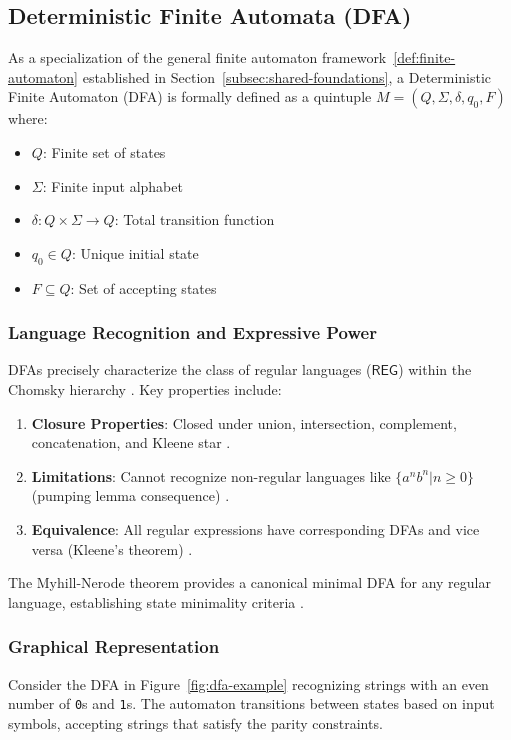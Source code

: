 \subsection{Deterministic Finite Automata (DFA)}
\label{subsec:dfa} 

As a specialization of the general finite automaton framework~\ref{def:finite-automaton} established in Section~\ref{subsec:shared-foundations}, a Deterministic Finite Automaton (DFA)\cite{hopcroft2006introduction} is formally defined as a quintuple \( M = (Q, \Sigma, \delta, q_0, F) \) where:
\begin{itemize}
    \item \( Q \): Finite set of states
    \item \( \Sigma \): Finite input alphabet
    \item \( \delta: Q \times \Sigma \rightarrow Q \): Total transition function
    \item \( q_0 \in Q \): Unique initial state
    \item \( F \subseteq Q \): Set of accepting states
\end{itemize}

\subsubsection{Language Recognition and Expressive Power}
DFAs precisely characterize the class of regular languages (\(\mathsf{REG}\)) within the Chomsky hierarchy \cite{hopcroft2006introduction}. Key properties include:

\begin{enumerate}
    \item \textbf{Closure Properties}: Closed under union, intersection, complement, concatenation, and Kleene star \cite{myhill1957finite}.
    \item \textbf{Limitations}: Cannot recognize non-regular languages like \( \{a^nb^n | n \geq 0\} \) (pumping lemma consequence) \cite{sipser2012introduction}.
    \item \textbf{Equivalence}: All regular expressions have corresponding DFAs and vice versa (Kleene's theorem) \cite{kleene1956representation}.
\end{enumerate}

The Myhill-Nerode theorem provides a canonical minimal DFA for any regular language, establishing state minimality criteria \cite{nerode1958linear}.

\subsubsection{Graphical Representation}
Consider the DFA in Figure~\ref{fig:dfa-example} recognizing strings with an even number of \texttt{0}s and \texttt{1}s. The automaton transitions between states based on input symbols, accepting strings that satisfy the parity constraints.

